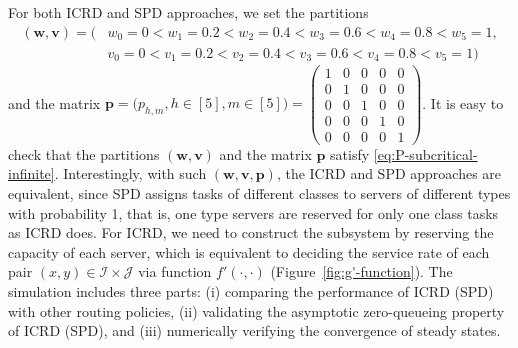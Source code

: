 \documentclass[11pt, reqno]{article}
\numberwithin{equation}{section}
\numberwithin{theorem}{section}
\begin{document}
For both ICRD and SPD approaches, we set the partitions \begin{equation*}
    \begin{split}
        (\mathbf{w},\mathbf{v})=(&w_0=0<w_1=0.2<w_2=0.4<w_3=0.6<w_4=0.8<w_5=1, \\&v_0=0<v_1=0.2<v_2=0.4<v_3=0.6<v_4=0.8<v_5=1)
    \end{split}
\end{equation*} and the matrix $\mathbf{p}=\big(p_{h,m},h\in[5],m\in[5]\big)=\begin{pmatrix}
        1 & 0 & 0 & 0 & 0\\     
        0 & 1 & 0 & 0 & 0\\  
        0 & 0 & 1 & 0 & 0\\   
        0 & 0 & 0 & 1 & 0\\     
        0 & 0 & 0 & 0 & 1
    \end{pmatrix}$. It is easy to check that the partitions $(\mathbf{w},\mathbf{v})$ and the matrix $\mathbf{p}$ satisfy \eqref{eq:P-subcritical-infinite}. Interestingly, with such $(\mathbf{w},\mathbf{v},\mathbf{p})$, the ICRD and SPD approaches are equivalent, since SPD assigns tasks of different classes to servers of different types with probability 1, that is, one type servers are reserved for only one class tasks as ICRD does. For ICRD, we need to construct the subsystem by reserving the capacity of each server, which is equivalent to deciding the service rate of each pair $(x,y)\in\mathcal{I}\times\mathcal{J}$ via function $f'(\cdot,\cdot)$ (Figure~\ref{fig:g'-function}). 
The simulation includes three parts: (i) comparing the performance of ICRD (SPD) with other routing policies, (ii) validating the asymptotic zero-queueing property of ICRD (SPD), and (iii) numerically verifying the convergence of steady states.
\vspace{.2cm}
\end{document}
